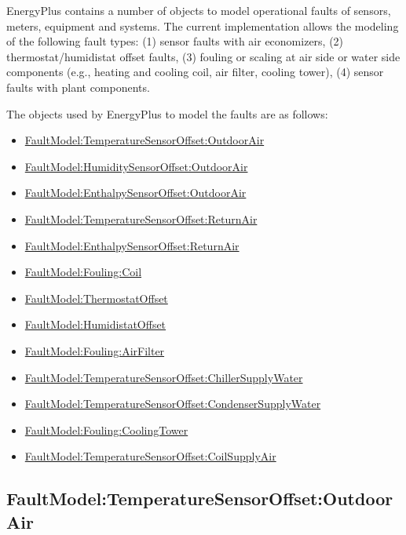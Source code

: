 EnergyPlus contains a number of objects to model operational faults of sensors, meters, equipment and systems. The current implementation allows the modeling of the following fault types: (1) sensor faults with air economizers, (2) thermostat/humidistat offset faults, (3) fouling or scaling at air side or water side components (e.g., heating and cooling coil, air filter, cooling tower), (4) sensor faults with plant components.

The objects used by EnergyPlus to model the faults are as follows:

\begin{itemize}
\item
  \hyperref[faultmodeltemperaturesensoroffsetoutdoorair]{FaultModel:TemperatureSensorOffset:OutdoorAir}
\item
  \hyperref[faultmodelhumiditysensoroffsetoutdoorair]{FaultModel:HumiditySensorOffset:OutdoorAir}
\item
  \hyperref[faultmodelenthalpysensoroffsetoutdoorair]{FaultModel:EnthalpySensorOffset:OutdoorAir}
\item
  \hyperref[faultmodeltemperaturesensoroffsetreturnair]{FaultModel:TemperatureSensorOffset:ReturnAir}
\item
  \hyperref[faultmodelenthalpysensoroffsetreturnair]{FaultModel:EnthalpySensorOffset:ReturnAir}
\item
  \hyperref[faultmodelfoulingcoil]{FaultModel:Fouling:Coil}
\item
  \hyperref[faultmodelthermostatoffset]{FaultModel:ThermostatOffset}
\item
  \hyperref[faultmodelhumidistatoffset]{FaultModel:HumidistatOffset}
\item
  \hyperref[faultmodelfoulingairfilter]{FaultModel:Fouling:AirFilter}
\item
  \hyperref[faultmodeltemperaturesensoroffsetchillersupplywater]{FaultModel:TemperatureSensorOffset:ChillerSupplyWater}
\item
  \hyperref[faultmodeltemperaturesensoroffsetcondensersupplywater]{FaultModel:TemperatureSensorOffset:CondenserSupplyWater}
\item
  \hyperref[faultmodelfoulingcoolingtower]{FaultModel:Fouling:CoolingTower}
\item
  \hyperref[faultmodeltemperaturesensoroffsetcoilsupplyair]{FaultModel:TemperatureSensorOffset:CoilSupplyAir}
\end{itemize}

\subsection{FaultModel:TemperatureSensorOffset:OutdoorAir}\label{faultmodeltemperaturesensoroffsetoutdoorair}

